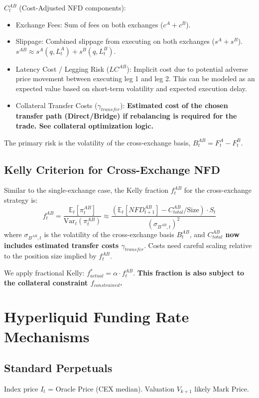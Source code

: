 \documentclass{article}
\begin{document}
$C^{AB}_t$ (Cost-Adjusted NFD components):
\begin{itemize}
    \item Exchange Fees: Sum of fees on both exchanges ($c^A + c^B$).
    \item Slippage: Combined slippage from executing on both exchanges ($s^A + s^B$). $s^{AB} \approx s^A(q, L^A_t) + s^B(q, L^B_t)$.
    \item Latency Cost / Legging Risk ($LC^{AB}$): Implicit cost due to potential adverse price movement between executing leg 1 and leg 2. This can be modeled as an expected value based on short-term volatility and expected execution delay.
    \item Collateral Transfer Costs ($\gamma_{transfer}$): \textbf{Estimated cost of the chosen transfer path (Direct/Bridge) if rebalancing is required for the trade. See collateral optimization logic.}
\end{itemize}

The primary risk is the volatility of the cross-exchange basis, $B^{AB}_t = F^A_t - F^B_t$.

\subsection{Kelly Criterion for Cross-Exchange NFD}

Similar to the single-exchange case, the Kelly fraction $f^{AB}_t$ for the cross-exchange strategy is:
\begin{equation} \label{eq:kelly_cross_pair_strat_updated}
    f^{AB}_t = \frac{\mathbb{E}_t[\pi^{AB}_t]}{\text{Var}_t(\pi^{AB}_t)} \approx \frac{(\mathbb{E}_t[NFD^{AB}_{t+1}] - C^{AB}_{total} / \text{Size}) \cdot S_t}{(\sigma_{B^{AB}, t})^2}
\end{equation}
where $\sigma_{B^{AB}, t}$ is the volatility of the cross-exchange basis $B^{AB}_t$, and \textbf{$C^{AB}_{total}$ now includes estimated transfer costs $\gamma_{transfer}$}. Costs need careful scaling relative to the position size implied by $f^{AB}_t$.

We apply fractional Kelly: $f^*_{actual} = \alpha \cdot f^{AB}_t$. \textbf{This fraction is also subject to the collateral constraint $f_{constrained}$.}

\section{Hyperliquid Funding Rate Mechanisms}

\subsection{Standard Perpetuals}
Index price $I_t$ = Oracle Price (CEX median). Valuation $V_{k+1}$ likely Mark Price.
\end{document}
